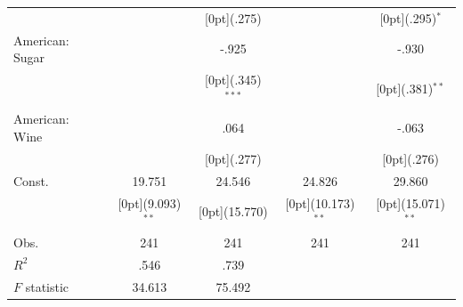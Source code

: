 \documentclass[12pt,a4paper,titlepage]{article}
\begin{document}
{\begin{tabular*}{\textwidth}{@{\extracolsep{\fill}}lcccc}
&	&	\raisebox{.7ex}[0pt]{\scriptsize (.275)} &	&	\raisebox{.7ex}[0pt]{\scriptsize (.295)$^{*}$} \\
American: Sugar &	&	-.925 &	&	-.930 \\
&	&	\raisebox{.7ex}[0pt]{\scriptsize (.345)$^{***}$} &	&	\raisebox{.7ex}[0pt]{\scriptsize (.381)$^{**}$} \\
American: Wine &	&	.064 &	&	-.063 \\
&	&	\raisebox{.7ex}[0pt]{\scriptsize (.277)} &	&	\raisebox{.7ex}[0pt]{\scriptsize (.276)} \\
Const. &	19.751 &	24.546 &	24.826 &	29.860 \\
&	\raisebox{.7ex}[0pt]{\scriptsize (9.093)$^{**}$} &	\raisebox{.7ex}[0pt]{\scriptsize (15.770)} &	\raisebox{.7ex}[0pt]{\scriptsize (10.173)$^{**}$} &	\raisebox{.7ex}[0pt]{\scriptsize (15.071)$^{**}$} \\
Obs. &	241 &	241 &	241 &	241 \\
$ R^2$ &	.546 &	.739 &	&	\\
$ F$ statistic &	34.613 &	75.492 &	&	\\
\hline\hline				
\end{tabular*}



}
\end{document}
